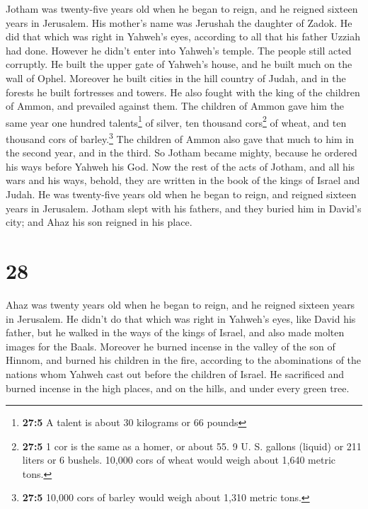  Jotham was twenty-five years old when he began to reign,
and he reigned sixteen years in Jerusalem. His mother's name was
Jerushah the daughter of Zadok.  He did that which was
right in Yahweh's eyes, according to all that his father Uzziah had
done. However he didn't enter into Yahweh's temple. The people still
acted corruptly.  He built the upper gate of Yahweh's
house, and he built much on the wall of Ophel.  Moreover
he built cities in the hill country of Judah, and in the forests he
built fortresses and towers.  He also fought with the king
of the children of Ammon, and prevailed against them. The children of
Ammon gave him the same year one hundred talents\footnote{\textbf{27:5}
  A talent is about 30 kilograms or 66 pounds} of silver, ten thousand
cors\footnote{\textbf{27:5} 1 cor is the same as a homer, or about 55. 9
  U. S. gallons (liquid) or 211 liters or 6 bushels. 10,000 cors of
  wheat would weigh about 1,640 metric tons.} of wheat, and ten thousand
cors of barley.\footnote{\textbf{27:5} 10,000 cors of barley would weigh
  about 1,310 metric tons.} The children of Ammon also gave that much to
him in the second year, and in the third.  So Jotham
became mighty, because he ordered his ways before Yahweh his God.
 Now the rest of the acts of Jotham, and all his wars and
his ways, behold, they are written in the book of the kings of Israel
and Judah.  He was twenty-five years old when he began to
reign, and reigned sixteen years in Jerusalem.  Jotham
slept with his fathers, and they buried him in David's city; and Ahaz
his son reigned in his place.

\hypertarget{section-27}{%
\section{28}\label{section-27}}

 Ahaz was twenty years old when he began to reign, and he
reigned sixteen years in Jerusalem. He didn't do that which was right in
Yahweh's eyes, like David his father,  but he walked in
the ways of the kings of Israel, and also made molten images for the
Baals.  Moreover he burned incense in the valley of the
son of Hinnom, and burned his children in the fire, according to the
abominations of the nations whom Yahweh cast out before the children of
Israel.  He sacrificed and burned incense in the high
places, and on the hills, and under every green tree.

